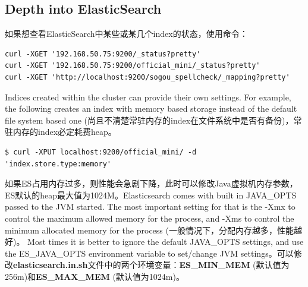 \subsection{Depth into ElasticSearch}
\par 如果想查看ElasticSearch中某些或某几个index的状态，使用命令：
\begin{verbatim}
curl -XGET '192.168.50.75:9200/_status?pretty'
curl -XGET '192.168.50.75:9200/official_mini/_status?pretty'
curl -XGET 'http://localhost:9200/sogou_spellcheck/_mapping?pretty'
\end{verbatim}
\par Indices created within the cluster can provide their own settings. For example, the following creates an index with memory based storage instead of the default file system based one (尚且不清楚常驻内存的index在文件系统中是否有备份)，常驻内存的index必定耗费heap。
\begin{verbatim}
$ curl -XPUT localhost:9200/official_mini/ -d 'index.store.type:memory'
\end{verbatim}
\par 如果ES占用内存过多，则性能会急剧下降，此时可以修改Java虚拟机内存参数，ES默认的heap最大值为1024M。Elasticsearch comes with built in JAVA\_OPTS passed to the JVM started. The most important setting for that is the -Xmx to control the maximum allowed memory for the process, and -Xms to control the minimum allocated memory for the process (一般情况下，分配内存越多，性能越好)。 Most times it is better to ignore the default JAVA\_OPTS settings, and use the ES\_JAVA\_OPTS environment variable to set/change JVM settings。可以修改\textbf{elasticsearch.in.sh}文件中的两个环境变量：\textbf{ES\_MIN\_MEM} (默认值为256m)和\textbf{ES\_MAX\_MEM} (默认值为1024m)。
